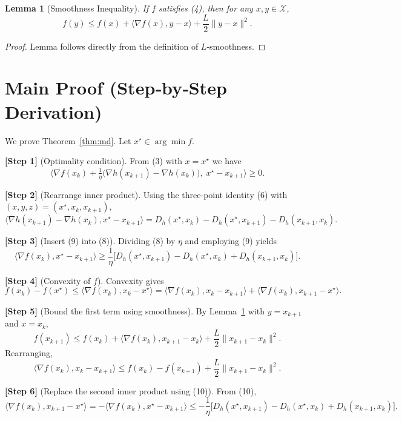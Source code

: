 \documentclass{article}
\newtheorem{lemma}{Lemma}
\begin{document}
\begin{lemma}[Smoothness Inequality]\label{lem:smooth}
If $f$ satisfies (4), then for any $x,y\in\mathcal X$,
\[
f(y)\le f(x)+\langle\nabla f(x),y-x\rangle+\frac{L}{2}\|y-x\|^{2}. \tag{7}
\]
\end{lemma}
\begin{proof}
Lemma follows directly from the definition of $L$‑smoothness. \hfill\qedsymbol
\end{proof}

\section*{Main Proof (Step‑by‑Step Derivation)}
We prove Theorem~\ref{thm:md}. Let $x^{\star}\in\arg\min f$.

\medskip
\noindent\textbf{[Step 1]} (Optimality condition).  
From (3) with $x=x^{\star}$ we have
\[
\big\langle\nabla f(x_{k})+\tfrac{1}{\eta}\big(\nabla h(x_{k+1})-\nabla h(x_{k})\big),
\;x^{\star}-x_{k+1}\big\rangle\ge0.
\tag{8}
\]

\noindent\textbf{[Step 2]} (Rearrange inner product).  
Using the three‑point identity (6) with $(x,y,z)=(x^{\star},x_{k},x_{k+1})$,
\[
\langle\nabla h(x_{k+1})-\nabla h(x_{k}),x^{\star}-x_{k+1}\rangle
= D_{h}(x^{\star},x_{k})-D_{h}(x^{\star},x_{k+1})-D_{h}(x_{k+1},x_{k}). \tag{9}
\]

\noindent\textbf{[Step 3]} (Insert (9) into (8)).  
Dividing (8) by $\eta$ and employing (9) yields
\[
\langle\nabla f(x_{k}),x^{\star}-x_{k+1}\rangle
\ge\frac{1}{\eta}\Big[D_{h}(x^{\star},x_{k+1})-D_{h}(x^{\star},x_{k})+D_{h}(x_{k+1},x_{k})\Big].
\tag{10}
\]

\noindent\textbf{[Step 4]} (Convexity of $f$).  
Convexity gives
\[
f(x_{k})-f(x^{\star})\le\langle\nabla f(x_{k}),x_{k}-x^{\star}\rangle
= \langle\nabla f(x_{k}),x_{k}-x_{k+1}\rangle
   +\langle\nabla f(x_{k}),x_{k+1}-x^{\star}\rangle. \tag{11}
\]

\noindent\textbf{[Step 5]} (Bound the first term using smoothness).  
By Lemma~\ref{lem:smooth} with $y=x_{k+1}$ and $x=x_{k}$,
\[
f(x_{k+1})\le f(x_{k})+\langle\nabla f(x_{k}),x_{k+1}-x_{k}\rangle
            +\frac{L}{2}\|x_{k+1}-x_{k}\|^{2}.
\]
Rearranging,
\[
\langle\nabla f(x_{k}),x_{k}-x_{k+1}\rangle
\le f(x_{k})-f(x_{k+1})+\frac{L}{2}\|x_{k+1}-x_{k}\|^{2}. \tag{12}
\]

\noindent\textbf{[Step 6]} (Replace the second inner product using (10)).  
From (10),
\[
\langle\nabla f(x_{k}),x_{k+1}-x^{\star}\rangle
= -\langle\nabla f(x_{k}),x^{\star}-x_{k+1}\rangle
\le -\frac{1}{\eta}\Big[D_{h}(x^{\star},x_{k+1})-D_{h}(x^{\star},x_{k})+D_{h}(x_{k+1},x_{k})\Big].
\tag{13}
\]
\end{document}
